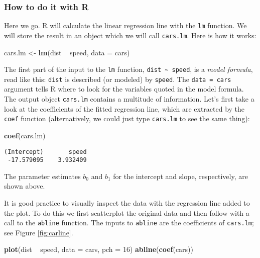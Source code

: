 \documentclass[]{book}
\newenvironment{Shaded}{\begin{snugshade}}{\end{snugshade}}
\newcommand{\KeywordTok}[1]{\textcolor[rgb]{0.13,0.29,0.53}{\textbf{{#1}}}}
\newcommand{\DataTypeTok}[1]{\textcolor[rgb]{0.13,0.29,0.53}{{#1}}}
\newcommand{\DecValTok}[1]{\textcolor[rgb]{0.00,0.00,0.81}{{#1}}}
\newcommand{\StringTok}[1]{\textcolor[rgb]{0.31,0.60,0.02}{{#1}}}
\newcommand{\NormalTok}[1]{{#1}}
\numberwithin{equation}{chapter}
\numberwithin{figure}{chapter}
\theoremstyle{plain}
\theoremstyle{definition}
\theoremstyle{remark}
\theoremstyle{definition}
\theoremstyle{definition}
\theoremstyle{remark}
\begin{document}
\subsubsection{How to do it with R}\label{how-to-do-it-with-r-39}

Here we go. R will calculate the linear regression line with the
\texttt{lm} function. We will store the result in an object which we
will call \texttt{cars.lm}. Here is how it works:

\begin{Shaded}
\begin{Highlighting}[]
\NormalTok{cars.lm <-}\StringTok{ }\KeywordTok{lm}\NormalTok{(dist ~}\StringTok{ }\NormalTok{speed, }\DataTypeTok{data =} \NormalTok{cars)}
\end{Highlighting}
\end{Shaded}

The first part of the input to the \texttt{lm} function,
\texttt{dist\ \textasciitilde{}\ speed}, is a \emph{model formula}, read
like this: \texttt{dist} is described (or modeled) by \texttt{speed}.
The \texttt{data\ =\ cars} argument tells R where to look for the
variables quoted in the model formula. The output object
\texttt{cars.lm} contains a multitude of information. Let's first take a
look at the coefficients of the fitted regression line, which are
extracted by the \texttt{coef} function (alternatively, we could just
type \texttt{cars.lm} to see the same thing):

\begin{Shaded}
\begin{Highlighting}[]
\KeywordTok{coef}\NormalTok{(cars.lm)}
\end{Highlighting}
\end{Shaded}

\begin{verbatim}
(Intercept)       speed 
 -17.579095    3.932409 
\end{verbatim}

The parameter estimates \(b_{0}\) and \(b_{1}\) for the intercept and
slope, respectively, are shown above.

It is good practice to visually inspect the data with the regression
line added to the plot. To do this we first scatterplot the original
data and then follow with a call to the \texttt{abline} function. The
inputs to \texttt{abline} are the coefficients of \texttt{cars.lm}; see
Figure \ref{fig:carline}.

\begin{Shaded}
\begin{Highlighting}[]
\KeywordTok{plot}\NormalTok{(dist ~}\StringTok{ }\NormalTok{speed, }\DataTypeTok{data =} \NormalTok{cars, }\DataTypeTok{pch =} \DecValTok{16}\NormalTok{)}
\KeywordTok{abline}\NormalTok{(}\KeywordTok{coef}\NormalTok{(cars))}
\end{Highlighting}
\end{Shaded}
\end{document}
